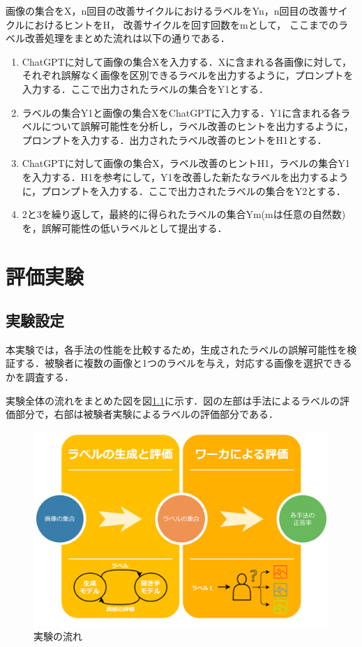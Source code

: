 \documentclass[a4paper,11pt]{jreport}
\begin{document}
画像の集合をX，n回目の改善サイクルにおけるラベルをYn，n回目の改善サイクルにおけるヒントをH，
改善サイクルを回す回数をmとして，
ここまでのラベル改善処理をまとめた流れは以下の通りである．

\begin{enumerate}
  \item ChatGPTに対して画像の集合Xを入力する．Xに含まれる各画像に対して，それぞれ誤解なく画像を区別できるラベルを出力するように，プロンプトを入力する．ここで出力されたラベルの集合をY1とする．
  \item ラベルの集合Y1と画像の集合XをChatGPTに入力する．Y1に含まれる各ラベルについて誤解可能性を分析し，ラベル改善のヒントを出力するように，プロンプトを入力する．出力されたラベル改善のヒントをH1とする．
  \item ChatGPTに対して画像の集合X，ラベル改善のヒントH1，ラベルの集合Y1を入力する．H1を参考にして，Y1を改善した新たなラベルを出力するように，プロンプトを入力する．ここで出力されたラベルの集合をY2とする．
  \item 2と3を繰り返して，最終的に得られたラベルの集合Ym(mは任意の自然数)を，誤解可能性の低いラベルとして提出する．
\end{enumerate}


\chapter{評価実験}

\section{実験設定}

本実験では，各手法の性能を比較するため，生成されたラベルの誤解可能性を検証する．被験者に複数の画像と1つのラベルを与え，対応する画像を選択できるかを調査する．

実験全体の流れをまとめた図を図\ref{fig:flow_example}に示す．図の左部は手法によるラベルの評価部分で，右部は被験者実験によるラベルの評価部分である．

\begin{figure}[H]
  \centering
  \includegraphics[width=\linewidth]{figures/flow.png}
  \caption{実験の流れ}
  \label{fig:flow_example}
\end{figure}
\end{document}
